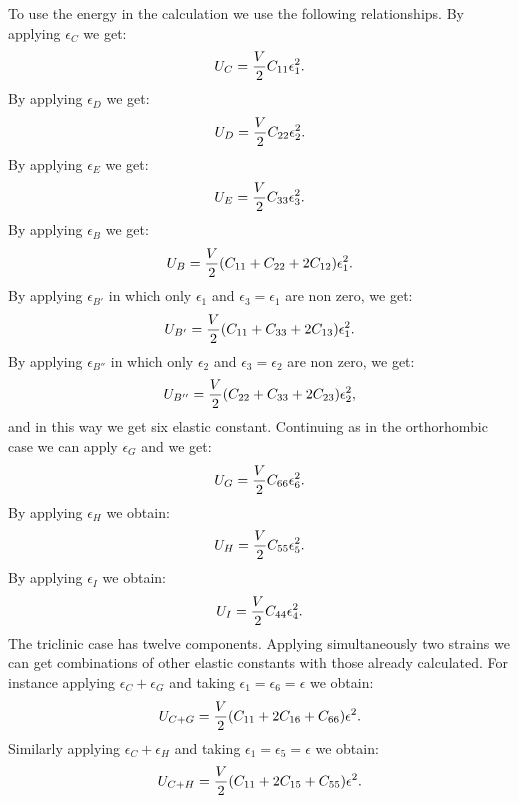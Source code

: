 \documentclass[12pt,a4paper]{article}
\begin{document}
To use the energy in the calculation we use the following
relationships. By applying $\epsilon_C$ we get:
\begin{equation}
U_C= {V \over 2} C_{11} \epsilon_1^2.
\end{equation}
By applying $\epsilon_D$ we get:
\begin{equation}
U_D= {V \over 2} C_{22} \epsilon_2^2.
\end{equation}
By applying $\epsilon_E$ we get:
\begin{equation}
U_E= {V \over 2} C_{33} \epsilon_3^2.
\end{equation}
By applying $\epsilon_B$ we get:
\begin{equation}
U_B= {V \over 2} (C_{11} + C_{22} + 2 C_{12}) \epsilon_1^2.
\end{equation}
By applying $\epsilon_{B'}$ in which only $\epsilon_1$ and
$\epsilon_3=\epsilon_1$ are non zero, we get:
\begin{equation}
U_{B'}= {V \over 2} (C_{11} + C_{33} + 2 C_{13}) \epsilon_1^2.
\end{equation}
By applying $\epsilon_{B''}$ in which only $\epsilon_2$ and
$\epsilon_3=\epsilon_2$ are non zero, we get:
\begin{equation}
U_{B''}= {V \over 2} (C_{22} + C_{33} + 2 C_{23}) \epsilon_2^2,
\end{equation}
and in this way we get six elastic constant. Continuing as in the
orthorhombic case we can
apply $\epsilon_G$ and we get:
\begin{equation}
U_G= {V \over 2} C_{66} \epsilon_6^2.
\end{equation}
By applying $\epsilon_H$ we obtain:
\begin{equation}
U_H= {V \over 2} C_{55} \epsilon_5^2.
\end{equation}
By applying $\epsilon_I$ we obtain:
\begin{equation}
U_I= {V \over 2} C_{44} \epsilon_4^2.
\end{equation}
The triclinic case has twelve components. Applying simultaneously two strains
we can get combinations of other elastic constants with those already
calculated. For instance applying $\epsilon_C + \epsilon_G$ and taking
$\epsilon_1=\epsilon_6=\epsilon$ we obtain:
\begin{equation}
U_{C+G}= {V \over 2} (C_{11}+2 C_{16} + C_{66}) \epsilon^2.
\end{equation}
Similarly applying $\epsilon_C + \epsilon_H$ and taking $\epsilon_1=
\epsilon_5=\epsilon$ we obtain:
\begin{equation}
U_{C+H}= {V \over 2} (C_{11}+2 C_{15} + C_{55}) \epsilon^2.
\end{equation}
\end{document}
